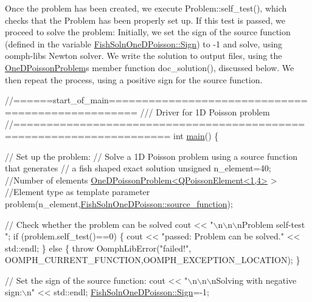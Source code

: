 Once the problem has been created, we execute {\ttfamily Problem\+::self\+\_\+test()}, which checks that the {\ttfamily Problem} has been properly set up. If this test is passed, we proceed to solve the problem\+: Initially, we set the sign of the source function (defined in the variable {\ttfamily \hyperlink{namespaceFishSolnOneDPoisson_a108e814ef887ffcc8caa7c65a7d30f06}{Fish\+Soln\+One\+D\+Poisson\+::\+Sign}}) to -\/1 and solve, using {\ttfamily oomph-\/lib\textquotesingle{}s} Newton solver. We write the solution to output files, using the {\ttfamily \hyperlink{classOneDPoissonProblem}{One\+D\+Poisson\+Problem}\textquotesingle{}s} member function {\ttfamily doc\+\_\+solution()}, discussed below. We then repeat the process, using a positive sign for the source function.

 
\begin{DoxyCodeInclude}
\textcolor{comment}{//======start\_of\_main==================================================}
\textcolor{comment}{/// Driver for 1D Poisson problem}
\textcolor{comment}{}\textcolor{comment}{//=====================================================================}
\textcolor{keywordtype}{int} \hyperlink{one__d__poisson_8cc_ae66f6b31b5ad750f1fe042a706a4e3d4}{main}()
\{

 \textcolor{comment}{// Set up the problem: }
 \textcolor{comment}{// Solve a 1D Poisson problem using a source function that generates}
 \textcolor{comment}{// a fish shaped exact solution}
 \textcolor{keywordtype}{unsigned} n\_element=40; \textcolor{comment}{//Number of elements}
 \hyperlink{classOneDPoissonProblem}{OneDPoissonProblem<QPoissonElement<1,4>} > \textcolor{comment}{//Element type as
       template parameter}
  problem(n\_element,\hyperlink{namespaceFishSolnOneDPoisson_afd2f5aef6b8868526dbf8e74d379697f}{FishSolnOneDPoisson::source\_function});

 \textcolor{comment}{// Check whether the problem can be solved}
 cout << \textcolor{stringliteral}{"\(\backslash\)n\(\backslash\)n\(\backslash\)nProblem self-test "};
 \textcolor{keywordflow}{if} (problem.self\_test()==0)  
  \{
   cout << \textcolor{stringliteral}{"passed: Problem can be solved."} << std::endl;
  \}
 \textcolor{keywordflow}{else} 
  \{
   \textcolor{keywordflow}{throw} OomphLibError(\textcolor{stringliteral}{"failed!"},
                       OOMPH\_CURRENT\_FUNCTION,OOMPH\_EXCEPTION\_LOCATION);
  \}

 \textcolor{comment}{// Set the sign of the source function:}
 cout << \textcolor{stringliteral}{"\(\backslash\)n\(\backslash\)n\(\backslash\)nSolving with negative sign:\(\backslash\)n"} << std::endl;
 \hyperlink{namespaceFishSolnOneDPoisson_a108e814ef887ffcc8caa7c65a7d30f06}{FishSolnOneDPoisson::Sign}=-1;


\end{DoxyCodeInclude}
